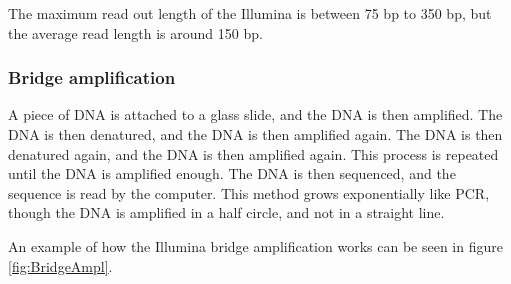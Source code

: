 The maximum read out length of the Illumina is between 75 bp to 350 bp, but the average read length is around 150 bp.

\subsubsection{Bridge amplification}
A piece of DNA is attached to a glass slide, and the DNA is then amplified. The DNA is then denatured, and the DNA is then amplified again. The DNA is then denatured again, and the DNA is then amplified again. This process is repeated until the DNA is amplified enough. The DNA is then sequenced, and the sequence is read by the computer. This method grows exponentially like PCR, though the DNA is amplified in a half circle, and not in a straight line.

An example of how the Illumina bridge amplification works can be seen in figure \ref{fig:BridgeAmpl}.

